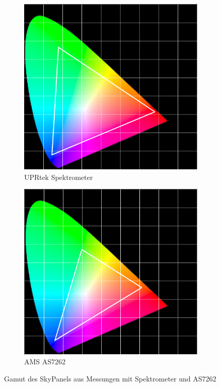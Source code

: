 \documentclass[11pt]{scrartcl}
\begin{document}
\begin{figure}[H]
    \centering
    \begin{subfigure}[b]{.49\textwidth}
        \includegraphics[width=\textwidth]{images/app_skypanel_gamut_uprtek.png}
        \caption{UPRtek Spektrometer}
    \end{subfigure}
    \hfill 
    \begin{subfigure}[b]{.49\textwidth}
        \includegraphics[width=\textwidth]{images/app_skypanel_gamut_as7262.png}
        \caption{AMS AS7262}
    \end{subfigure}
    \caption{Gamut des SkyPanels aus Messungen mit Spektrometer und AS7262}
\end{figure}
\end{document}
